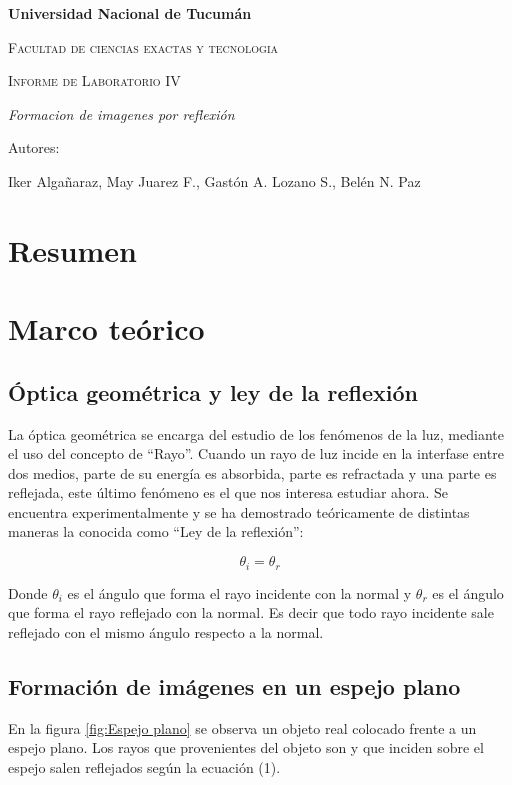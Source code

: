 \documentclass[a4paper,12pt]{article}
\begin{document}
\begin{titlepage}
    \centering
    {\bfseries\LARGE Universidad Nacional de Tucumán \par}
    \vspace{1cm}
    {\scshape\Large Facultad de ciencias exactas y tecnologia \par}
    \vspace{3cm}
    {\scshape\Huge Informe de Laboratorio IV \par}
    \vspace{3cm}
    {\itshape\Large Formacion de imagenes por reflexión \par}
    \vfill
    {\Large Autores: \par}
    {\Large Iker Algañaraz, May Juarez F., Gastón A. Lozano S., Belén N. Paz \par}
    \vfill
\end{titlepage}
    
    
\section*{Resumen}


\section*{Marco teórico}

\subsection*{Óptica geométrica y ley de la reflexión}

La óptica geométrica se encarga del estudio de los fenómenos de la luz, mediante el uso del concepto de “Rayo”. Cuando un rayo de luz incide en la interfase entre dos medios, parte de su energía es absorbida, parte es refractada y una parte es reflejada, este último fenómeno es el que nos interesa estudiar ahora. Se encuentra experimentalmente y se ha demostrado teóricamente de distintas maneras la conocida como “Ley de la reflexión”:

\begin{equation}
    \theta_i=\theta_r
\end{equation}

Donde $\theta_i$  es el ángulo que forma el rayo incidente con la normal y $\theta_r$ es el ángulo que forma el rayo reflejado con la normal. Es decir que todo rayo incidente sale reflejado con el mismo ángulo respecto a la normal.

\subsection*{Formación de imágenes en un espejo plano}
En la figura \ref{fig:Espejo plano} se observa un objeto real colocado frente a un espejo plano. Los rayos que provenientes del objeto son y que inciden sobre el espejo salen reflejados según la ecuación (1). 
\end{document}
